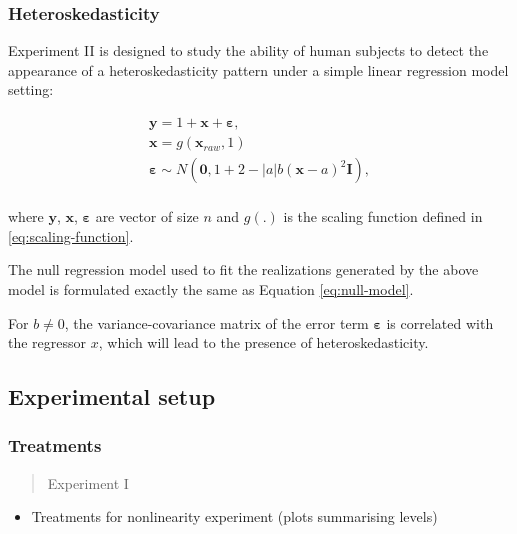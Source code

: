 \documentclass[]{interact}
\theoremstyle{plain}%
\theoremstyle{definition}
\theoremstyle{remark}
\def\tightlist{}
\begin{document}
\hypertarget{heteroskedasticity}{%
\subsubsection{Heteroskedasticity}\label{heteroskedasticity}}

Experiment II is designed to study the ability of human subjects to
detect the appearance of a heteroskedasticity pattern under a simple
linear regression model setting:

\begin{align} \label{eq:heter-model}
\boldsymbol{y} = 1 + \boldsymbol{x} + \boldsymbol{\varepsilon},\\
\boldsymbol{x} = g(\boldsymbol{x}_{raw}, 1)\\
\boldsymbol{\varepsilon} \sim N(\boldsymbol{0}, 1 + 2 - |a| b (\boldsymbol{x} - a)^2 \boldsymbol{I}), \\
\end{align}

where \(\boldsymbol{y}\), \(\boldsymbol{x}\),
\(\boldsymbol{\varepsilon}\) are vector of size \(n\) and \(g(.)\) is
the scaling function defined in \ref{eq:scaling-function}.

The null regression model used to fit the realizations generated by the
above model is formulated exactly the same as Equation
\ref{eq:null-model}.

For \(b \neq 0\), the variance-covariance matrix of the error term
\(\boldsymbol{\varepsilon}\) is correlated with the regressor \(x\),
which will lead to the presence of heteroskedasticity.

\hypertarget{experimental-setup}{%
\subsection{Experimental setup}\label{experimental-setup}}

\hypertarget{treatments}{%
\subsubsection{Treatments}\label{treatments}}

\begin{quote}
Experiment I
\end{quote}

\begin{itemize}
\tightlist
\item
  Treatments for nonlinearity experiment (plots summarising levels)
\end{itemize}
\end{document}
